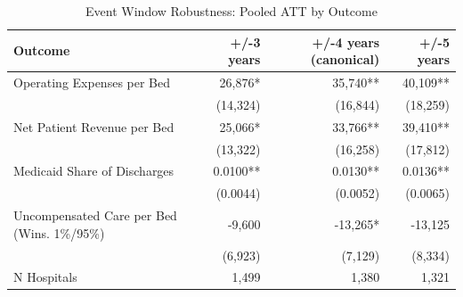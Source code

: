 \begin{table}[!h]
\centering
\caption{Event Window Robustness: Pooled ATT by Outcome}
\centering
\begin{tabular}[t]{lrrr}
\toprule
Outcome & +/-3 years & +/-4 years (canonical) & +/-5 years\\
\midrule
Operating Expenses per Bed & 26,876* & 35,740** & 40,109**\\
 & (14,324) & (16,844) & (18,259)\\
Net Patient Revenue per Bed & 25,066* & 33,766** & 39,410**\\
 & (13,322) & (16,258) & (17,812)\\
Medicaid Share of Discharges & 0.0100** & 0.0130** & 0.0136**\\
\addlinespace
 & (0.0044) & (0.0052) & (0.0065)\\
Uncompensated Care per Bed (Wins. 1\%/95\%) & -9,600 & -13,265* & -13,125\\
 & (6,923) & (7,129) & (8,334)\\
N Hospitals & 1,499 & 1,380 & 1,321\\
\bottomrule
\end{tabular}
\end{table}
